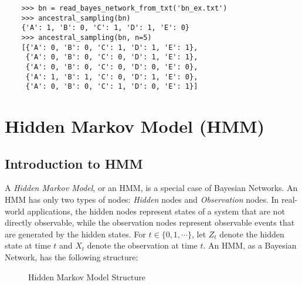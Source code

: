 \documentclass{article}
\theoremstyle{definition}
\begin{document}
\begin{verbatim}
    >>> bn = read_bayes_network_from_txt('bn_ex.txt')
    >>> ancestral_sampling(bn)
    {'A': 1, 'B': 0, 'C': 1, 'D': 1, 'E': 0}
    >>> ancestral_sampling(bn, n=5)
    [{'A': 0, 'B': 0, 'C': 1, 'D': 1, 'E': 1},
     {'A': 0, 'B': 0, 'C': 0, 'D': 1, 'E': 1},
     {'A': 0, 'B': 0, 'C': 0, 'D': 0, 'E': 0},
     {'A': 1, 'B': 1, 'C': 0, 'D': 1, 'E': 0},
     {'A': 0, 'B': 0, 'C': 1, 'D': 0, 'E': 1}]
\end{verbatim}

\pagebreak

\section{Hidden Markov Model (HMM)}

\subsection{Introduction to HMM} \label{sec:hmm_intro}

A \textit{Hidden Markov Model}, or an HMM, is a special case of Bayesian Networks. An HMM has only two types of nodes: \textit{Hidden} nodes and \textit{Observation} nodes. In real-world applications, the hidden nodes represent states of a system that are not directly observable, while the observation nodes represent observable events that are generated by the hidden states. For \(t\in \{0, 1, \cdots\}\), let \(Z_t\) denote the hidden state at time \(t\) and \(X_t\) denote the observation at time \(t\). An HMM, as a Bayesian Network, has the following structure:

\begin{figure}[htbp]
    \centering
    \caption{Hidden Markov Model Structure}
    \label{fig:hmm_structure}
\end{figure}
\end{document}
